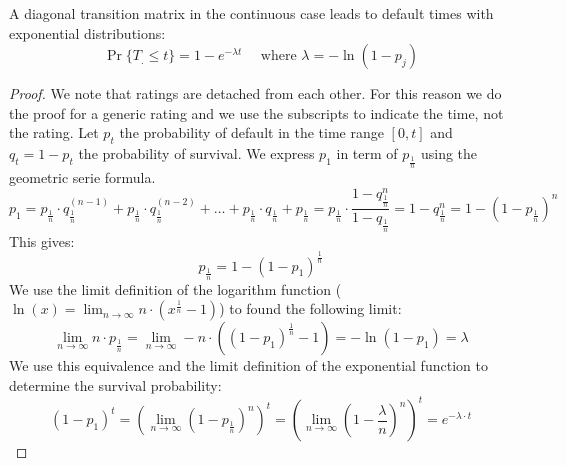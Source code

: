 \documentclass[11pt,fleqn]{book} %
\begin{document}
\begin{proposition}
A diagonal transition matrix in the continuous case leads to
default times with exponential distributions:
\begin{displaymath}
	\Pr\{T_. \le t\} = 1 - e^{-\lambda t} 
	\quad \text{ where } \lambda = -\ln(1-p_j)
\end{displaymath}
\end{proposition}
\begin{proof}
	We note that ratings are detached from each other. 
	For this reason we do the proof for a generic rating and we
	use the subscripts to indicate the time, not the rating.
	Let $p_t$ the probability of default in the time range $[0,t]$ and
	$q_t=1-p_t$ the probability of survival. We express $p_1$ in term
	of $p_{\frac{1}{n}}$ using the geometric serie formula.
	\begin{displaymath}
		p_1 = p_{\frac{1}{n}} \cdot q_{\frac{1}{n}}^{(n-1)} + 
			p_{\frac{1}{n}} \cdot q_{\frac{1}{n}}^{(n-2)} + \dots + 
			p_{\frac{1}{n}} \cdot q_{\frac{1}{n}} + 
			p_{\frac{1}{n}}
		= p_{\frac{1}{n}} \cdot \frac{1-q_{\frac{1}{n}}^n}{1-q_{\frac{1}{n}}}
		= 1 - q_{\frac{1}{n}}^n
		= 1- (1-p_{\frac{1}{n}})^n
	\end{displaymath}
	This gives:
	\begin{displaymath}
		p_{\frac{1}{n}} = 1-(1-p_1)^{\frac{1}{n}}
	\end{displaymath}
	We use the limit definition of the logarithm function 
	($\ln(x)=\lim_{n \to \infty} n \cdot(x^{\frac{1}{n}}-1)$) to
	found the following limit:
	\begin{displaymath}
		\lim_{n \to \infty} n \cdot p_{\frac{1}{n}} = 
		\lim_{n \to \infty} -n \cdot ((1-p_1)^{\frac{1}{n}} -1) =
		-\ln(1-p_1) = \lambda
	\end{displaymath}
	We use this equivalence and the limit definition of the 
	exponential function to determine the survival probability:
	\begin{displaymath}
		(1-p_1)^t 
		= \left( \lim_{n \to \infty} (1-p_{\frac{1}{n}})^n \right)^t
		= \left(\lim_{n \to \infty} (1-\frac{\lambda}{n})^n \right)^t
		= e^{-\lambda \cdot t}
	\end{displaymath}
\end{proof}
\end{document}
